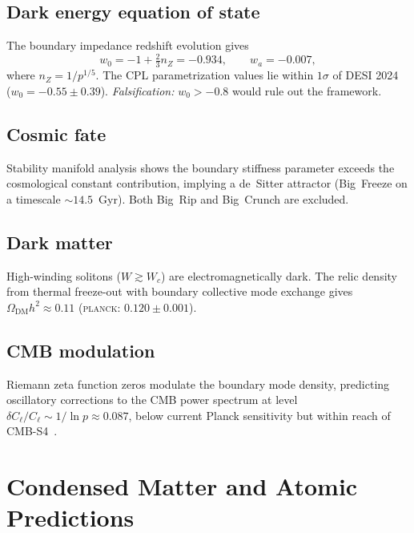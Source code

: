 \documentclass[aps,prd,twocolumn,superscriptaddress,longbibliography,nofootinbib]{revtex4-2}
\newcommand{\Wc}{W_{\!c}}
\begin{document}
\subsection{Dark energy equation of state}

The boundary impedance redshift evolution gives
\begin{equation}
w_0 = -1 + \tfrac{2}{3}n_Z = -0.934, \qquad
w_a = -0.007,
\end{equation}
where $n_Z = 1/p^{1/5}$.  The CPL parametrization values lie within $1\sigma$
of DESI 2024~\cite{DESI2024} ($w_0 = -0.55 \pm 0.39$).  \textit{Falsification:}
$w_0 > -0.8$ would rule out the framework.

\subsection{Cosmic fate}

Stability manifold analysis shows the boundary stiffness parameter exceeds the
cosmological constant contribution, implying a de~Sitter attractor (Big~Freeze
on a timescale $\sim 14.5$~Gyr).  Both Big~Rip and Big~Crunch are excluded.

\subsection{Dark matter}

High-winding solitons ($W \gtrsim \Wc$) are electromagnetically dark.
The relic density from thermal freeze-out with boundary collective mode
exchange gives $\Omega_{\mathrm{DM}}h^2 \approx 0.11$
(\textsc{planck}: $0.120 \pm 0.001$).

\subsection{CMB modulation}

Riemann zeta function zeros modulate the boundary mode density, predicting
oscillatory corrections to the CMB power spectrum at level
$\delta C_\ell / C_\ell \sim 1/\ln p \approx 0.087$, below current Planck
sensitivity but within reach of CMB-S4~\cite{CMBS4}.


\section{Condensed Matter and Atomic Predictions}
\label{sec:cm}
\end{document}
